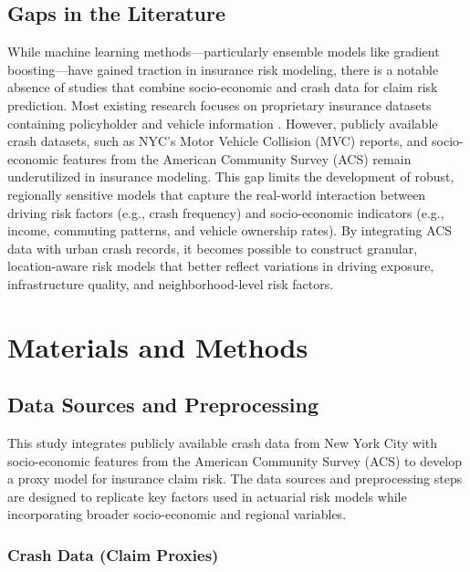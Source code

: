 \documentclass[
  number,
  review,
  3p]{elsarticle}
\begin{document}
\subsection{\texorpdfstring{\textbf{Gaps in the
Literature}}{Gaps in the Literature}}\label{gaps-in-the-literature}

While machine learning methods---particularly ensemble models like
gradient boosting---have gained traction in insurance risk modeling,
there is a notable absence of studies that combine socio-economic and
crash data for claim risk prediction. Most existing research focuses on
proprietary insurance datasets containing policyholder and vehicle
information \citep{clemente, henckaerts, jonkheijm}. However, publicly
available crash datasets, such as NYC's Motor Vehicle Collision (MVC)
reports, and socio-economic features from the American Community Survey
(ACS) remain underutilized in insurance modeling. This gap limits the
development of robust, regionally sensitive models that capture the
real-world interaction between driving risk factors (e.g., crash
frequency) and socio-economic indicators (e.g., income, commuting
patterns, and vehicle ownership rates). By integrating ACS data with
urban crash records, it becomes possible to construct granular,
location-aware risk models that better reflect variations in driving
exposure, infrastructure quality, and neighborhood-level risk factors.

\section{Materials and Methods}\label{materials-and-methods}

\subsection{\texorpdfstring{\textbf{Data Sources and
Preprocessing}}{Data Sources and Preprocessing}}\label{data-sources-and-preprocessing}

This study integrates publicly available crash data from New York City
with socio-economic features from the American Community Survey (ACS) to
develop a proxy model for insurance claim risk. The data sources and
preprocessing steps are designed to replicate key factors used in
actuarial risk models while incorporating broader socio-economic and
regional variables.

\subsubsection{Crash Data (Claim
Proxies)}\label{crash-data-claim-proxies}
\end{document}
